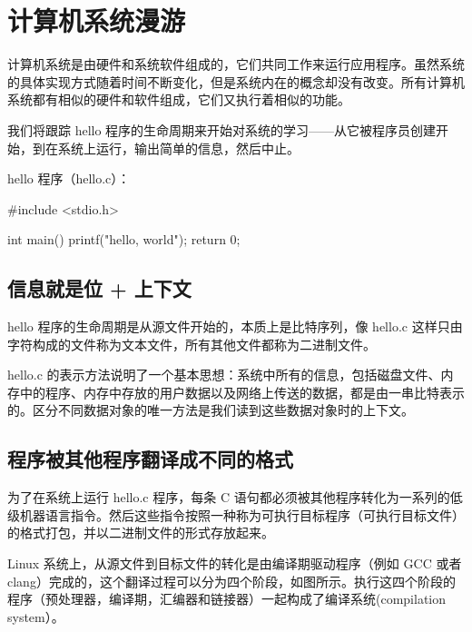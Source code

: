 \chapter{计算机系统漫游}

计算机系统是由硬件和系统软件组成的，它们共同工作来运行应用程序。虽然系统的具体实现方式随着时间不断变化，但是系统内在的概念却没有改变。所有计算机系统都有相似的硬件和软件组成，它们又执行着相似的功能。

我们将跟踪 hello 程序的生命周期来开始对系统的学习——从它被程序员创建开始，到在系统上运行，输出简单的信息，然后中止。

hello 程序（hello.c）：
\begin{cppcode}
#include <stdio.h>

int main() {
    printf("hello, world\n");
    return 0;
}
\end{cppcode}

\section{信息就是位 + 上下文}

hello 程序的生命周期是从源文件开始的，本质上是比特序列，像 hello.c 这样只由字符构成的文件称为文本文件，所有其他文件都称为二进制文件。

hello.c 的表示方法说明了一个基本思想：系统中所有的信息，包括磁盘文件、内存中的程序、内存中存放的用户数据以及网络上传送的数据，都是由一串比特表示的。区分不同数据对象的唯一方法是我们读到这些数据对象时的上下文。

\section{程序被其他程序翻译成不同的格式}

为了在系统上运行 hello.c 程序，每条 C 语句都必须被其他程序转化为一系列的低级机器语言指令。然后这些指令按照一种称为可执行目标程序（可执行目标文件）的格式打包，并以二进制文件的形式存放起来。

Linux 系统上，从源文件到目标文件的转化是由编译期驱动程序（例如 GCC 或者 clang）完成的，这个翻译过程可以分为四个阶段，如图所示。执行这四个阶段的程序（预处理器，编译期，汇编器和链接器）一起构成了编译系统(compilation system）。

